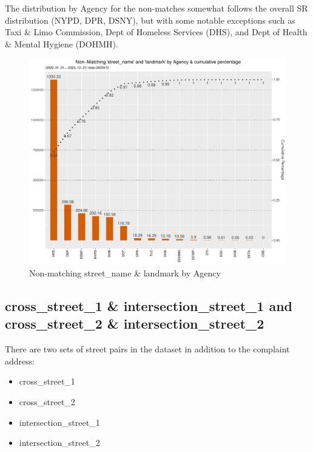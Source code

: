 \documentclass[12pt, titlepage]{article}
\begin{document}
{The distribution by Agency for the non-matches somewhat follows 
the overall SR distribution (NYPD, DPR, DSNY), but with some notable 
exceptions such as Taxi \& Limo Commission, Dept of Homeless 
Services (DHS), and Dept of Health \& Mental Hygiene (DOHMH).



\begin{figure}[tbp]
  \centering
  \includegraphics[width = \textwidth]
  {non-matchingstreet_nameandlandmark.pdf}
  \caption{Non-matching street\_name \& landmark by Agency}
  \label{fig:landmarkchart}
\end{figure}	


	
\subsection{cross\_street\_1 \& intersection\_street\_1 and cross\_street\_2 
\& intersection\_street\_2} There are two sets of street pairs in the 
dataset in addition to the complaint address:

	\begin{itemize}
		\item cross\_street\_1
		\item cross\_street\_2
		\item intersection\_street\_1
		\item intersection\_street\_2
	\end{itemize}
	
}
\end{document}
